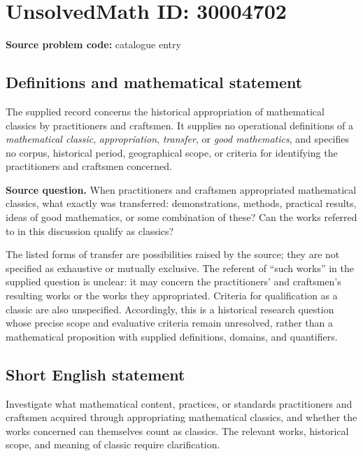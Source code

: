 \documentclass[11pt]{article}
\begin{document}
\section*{UnsolvedMath ID: 30004702}
\textbf{Source problem code:} catalogue entry
\subsection{Definitions and mathematical statement}
The supplied record concerns the historical appropriation of mathematical classics by practitioners and craftsmen. It supplies no operational definitions of a \emph{mathematical classic}, \emph{appropriation}, \emph{transfer}, or \emph{good mathematics}, and specifies no corpus, historical period, geographical scope, or criteria for identifying the practitioners and craftsmen concerned.

\textbf{Source question.} When practitioners and craftsmen appropriated mathematical classics, what exactly was transferred: demonstrations, methods, practical results, ideas of good mathematics, or some combination of these? Can the works referred to in this discussion qualify as classics?

The listed forms of transfer are possibilities raised by the source; they are not specified as exhaustive or mutually exclusive. The referent of ``such works'' in the supplied question is unclear: it may concern the practitioners' and craftsmen's resulting works or the works they appropriated. Criteria for qualification as a classic are also unspecified. Accordingly, this is a historical research question whose precise scope and evaluative criteria remain unresolved, rather than a mathematical proposition with supplied definitions, domains, and quantifiers.
\subsection{Short English statement}
Investigate what mathematical content, practices, or standards practitioners and craftsmen acquired through appropriating mathematical classics, and whether the works concerned can themselves count as classics. The relevant works, historical scope, and meaning of classic require clarification.
\end{document}
